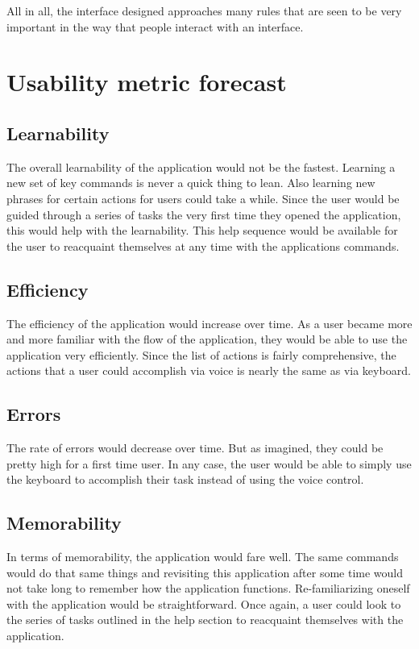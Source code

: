 \documentclass[11pt, oneside]{article}
\begin{document}
	All in all, the interface designed approaches many rules that are seen to be very important in the way that people interact with an interface.

\section{Usability metric forecast}

	\subsection{Learnability}
	The overall learnability of the application would not be the fastest. Learning a new set of key commands is never a quick thing to lean. Also learning new phrases for certain actions for users could take a while. Since the user would be guided through a series of tasks the very first time they opened the application, this would help with the learnability. This help sequence would be available for the user to reacquaint themselves at any time with the applications commands.

	\subsection{Efficiency}
	The efficiency of the application would increase over time. As a user became more and more familiar with the flow of the application, they would be able to use the application very efficiently. Since the list of actions is fairly comprehensive, the actions that a user could accomplish via voice is nearly the same as via keyboard.

	\subsection{Errors}
	The rate of errors would decrease over time. But as imagined, they could be pretty high for a first time user. In any case, the user would be able to simply use the keyboard to accomplish their task instead of using the voice control.

	\subsection{Memorability}
	In terms of memorability, the application would fare well. The same commands would do that same things and revisiting this application after some time would not take long to remember how the application functions. Re-familiarizing oneself with the application would be straightforward. Once again, a user could look to the series of tasks outlined in the help section to reacquaint themselves with the application.
\end{document}

